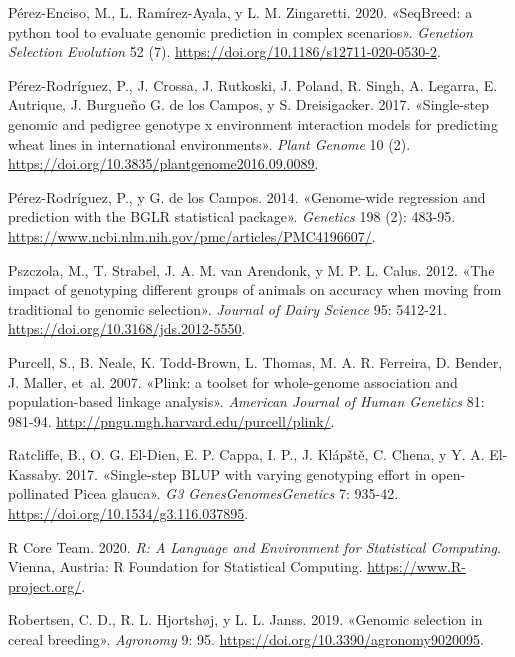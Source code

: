 \documentclass[11pt,spanish,a4paper,oneside,]{book} %
\begin{document}
\leavevmode\hypertarget{ref-cite:47}{}%
Pérez-Enciso, M., L. Ramírez-Ayala, y L. M. Zingaretti. 2020. «SeqBreed: a python tool to evaluate genomic prediction in complex scenarios». \emph{Genetion Selection Evolution} 52 (7). \url{https://doi.org/10.1186/s12711-020-0530-2}.

\leavevmode\hypertarget{ref-cite:19}{}%
Pérez-Rodríguez, P., J. Crossa, J. Rutkoski, J. Poland, R. Singh, A. Legarra, E. Autrique, J. Burgueño G. de los Campos, y S. Dreisigacker. 2017. «Single-step genomic and pedigree genotype x environment interaction models for predicting wheat lines in international environments». \emph{Plant Genome} 10 (2). \url{https://doi.org/10.3835/plantgenome2016.09.0089}.

\leavevmode\hypertarget{ref-cite:50}{}%
Pérez-Rodríguez, P., y G. de los Campos. 2014. «Genome-wide regression and prediction with the BGLR statistical package». \emph{Genetics} 198 (2): 483-95. \url{https://www.ncbi.nlm.nih.gov/pmc/articles/PMC4196607/}.

\leavevmode\hypertarget{ref-cite:74}{}%
Pszczola, M., T. Strabel, J. A. M. van Arendonk, y M. P. L. Calus. 2012. «The impact of genotyping different groups of animals on accuracy when moving from traditional to genomic selection». \emph{Journal of Dairy Science} 95: 5412-21. \url{https://doi.org/10.3168/jds.2012-5550}.

\leavevmode\hypertarget{ref-cite:49}{}%
Purcell, S., B. Neale, K. Todd-Brown, L. Thomas, M. A. R. Ferreira, D. Bender, J. Maller, et~al. 2007. «Plink: a toolset for whole-genome association and population-based linkage analysis». \emph{American Journal of Human Genetics} 81: 981-94. \url{http://pngu.mgh.harvard.edu/purcell/plink/}.

\leavevmode\hypertarget{ref-cite:72}{}%
Ratcliffe, B., O. G. El-Dien, E. P. Cappa, I. P., J. Klápště, C. Chena, y Y. A. El-Kassaby. 2017. «Single-step BLUP with varying genotyping effort in open-pollinated Picea glauca». \emph{G3 Genes\textbar{}Genomes\textbar{}Genetics} 7: 935-42. \url{https://doi.org/10.1534/g3.116.037895}.

\leavevmode\hypertarget{ref-cite:52}{}%
R Core Team. 2020. \emph{R: A Language and Environment for Statistical Computing}. Vienna, Austria: R Foundation for Statistical Computing. \url{https://www.R-project.org/}.

\leavevmode\hypertarget{ref-cite:63}{}%
Robertsen, C. D., R. L. Hjortshøj, y L. L. Janss. 2019. «Genomic selection in cereal breeding». \emph{Agronomy} 9: 95. \url{https://doi.org/10.3390/agronomy9020095}.
\end{document}

